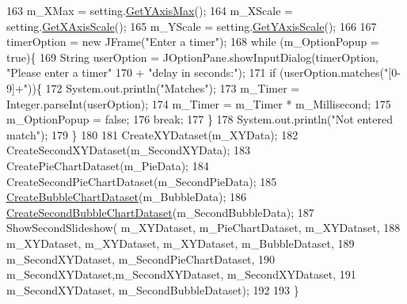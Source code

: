 \begin{DoxyCode}
163           m\_XMax = setting.\hyperlink{class_data_attribute_a81243eb8f7008e05e74b0f3571d2f08d}{GetYAxisMax}();
164           m\_XScale = setting.\hyperlink{class_data_attribute_a5a1de25600487aa958a19ce01151fea4}{GetXAxisScale}();
165           m\_YScale = setting.\hyperlink{class_data_attribute_a95259727ce91efc0e0eaa28487d944c5}{GetYAxisScale}();
166            
167           timerOption  = \textcolor{keyword}{new} JFrame(\textcolor{stringliteral}{"Enter a timer"});
168             \textcolor{keywordflow}{while} (m\_OptionPopup = \textcolor{keyword}{true})\{
169                 String userOption = JOptionPane.showInputDialog(timerOption, \textcolor{stringliteral}{"Please enter a timer"}
170                         + \textcolor{stringliteral}{"delay in seconds:"});
171                   \textcolor{keywordflow}{if} (userOption.matches(\textcolor{stringliteral}{"[0-9]+"}))\{
172                       System.out.println(\textcolor{stringliteral}{"Matches"});
173                       m\_Timer = Integer.parseInt(userOption);
174                       m\_Timer = m\_Timer * m\_Millisecond;
175                       m\_OptionPopup = \textcolor{keyword}{false};
176                       \textcolor{keywordflow}{break};
177                   \}
178                   System.out.println(\textcolor{stringliteral}{"Not entered match"});
179             \} 
180           
181           CreateXYDataset(m\_XYData);
182           CreateSecondXYDataset(m\_SecondXYData);
183           CreatePieChartDataset(m\_PieData);
184           CreateSecondPieChartDataset(m\_SecondPieData);
185           \hyperlink{class_slideshow_a8eabfefadfab208b396dcfef42f052a1}{CreateBubbleChartDataset}(m\_BubbleData);
186           \hyperlink{class_slideshow_a5f490654d036fbc20f7d96acf7cb6d0a}{CreateSecondBubbleChartDataset}(m\_SecondBubbleData);
187           ShowSecondSlideshow(  m\_XYDataset, m\_PieChartDataset, m\_XYDataset,
188                 m\_XYDataset, m\_XYDataset, m\_XYDataset, m\_BubbleDataset,
189                 m\_SecondXYDataset, m\_SecondPieChartDataset,
190                 m\_SecondXYDataset,m\_SecondXYDataset, m\_SecondXYDataset, 
191                 m\_SecondXYDataset, m\_SecondBubbleDataset);
192 
193     \}
\end{DoxyCode}


